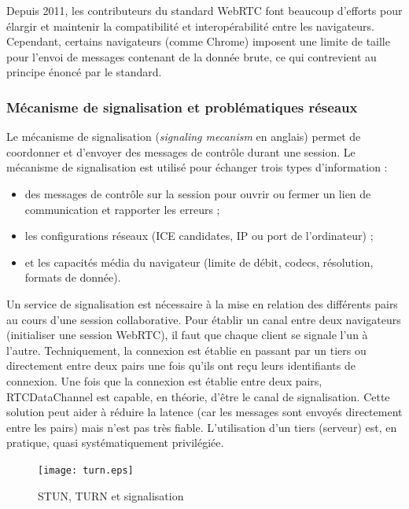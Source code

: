 
Depuis 2011, les contributeurs du standard WebRTC font beaucoup 
d'efforts pour élargir et maintenir la compatibilité et interopérabilité entre les navigateurs.
Cependant, certains navigateurs (comme Chrome) imposent une limite de taille 
pour l'envoi de messages contenant de la donnée brute, ce qui contrevient au 
principe énoncé par le standard.

\subsubsection{Mécanisme de signalisation et problématiques réseaux}
Le mécanisme de signalisation (\textit{signaling mecanism} en anglais) 
permet de coordonner et d'envoyer des messages de contrôle durant une 
session. Le mécanisme de signalisation est utilisé pour échanger trois 
types d'information : 
\begin{itemize}
	\item des messages de contrôle sur la session pour ouvrir ou fermer un 
	lien de communication et rapporter les erreurs ;
	\item les configurations réseaux (\gls{ICE} candidates, IP ou
	port de l'ordinateur) ; 
	\item et les capacités média du navigateur (limite de débit, codecs, 
	résolution, formats de donnée).
\end{itemize}
Un service de signalisation est nécessaire à la mise en relation des 
différents pairs au cours d'une session collaborative. 
Pour établir un canal entre deux navigateurs (initialiser une session 
WebRTC), il faut que chaque client se signale l'un à l'autre. 
Techniquement, la connexion est établie en passant par 
un tiers ou directement entre deux pairs une fois qu'ils ont reçu leurs 
identifiants de connexion. 
Une fois que la connexion est établie entre deux pairs, 
RTCDataChannel est capable, en théorie, d'être le canal de signalisation. 
Cette solution peut aider à réduire la latence (car les messages sont 
envoyés directement entre les pairs) mais n'est pas très fiable. L'utilisation 
d'un tiers (serveur) est, en pratique, quasi systématiquement privilégiée.

\begin{figure}[hbt]
	\centering
	\texttt{[image: turn.eps]}
	\caption{STUN, TURN et signalisation}
	\label{fig:turn}
\end{figure} 

